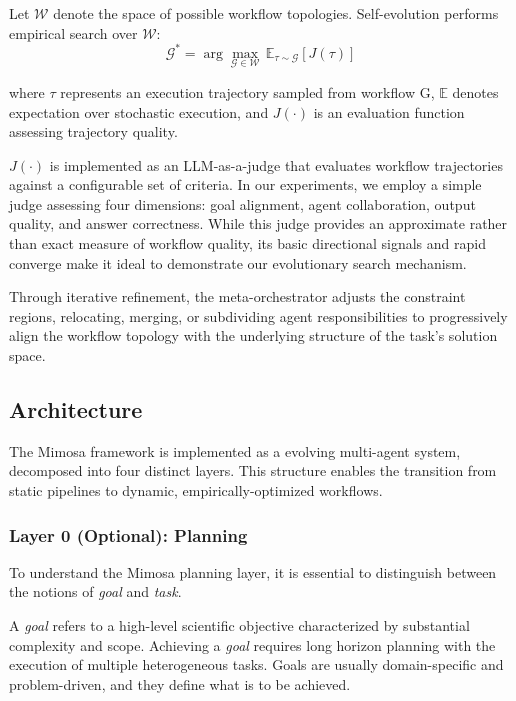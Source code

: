 \documentclass{article}
\begin{document}
Let $\mathcal{W}$ denote the space of possible workflow topologies. Self-evolution performs empirical search over $\mathcal{W}$:
\begin{equation}
    \mathcal{G}^* = \arg\max_{\mathcal{G} \in \mathcal{W}} \, \mathbb{E}_{\tau \sim \mathcal{G}}[J(\tau)]
\end{equation}

where $\tau$ represents an execution trajectory sampled from workflow G, $\mathbb{E}$ denotes expectation over stochastic execution, and $J(\cdot)$ is an evaluation function assessing trajectory quality.

$J(\cdot)$ is implemented as an LLM-as-a-judge that evaluates workflow trajectories against a configurable set of criteria. In our experiments, we employ a simple judge assessing four dimensions: goal alignment, agent collaboration, output quality, and answer correctness. While this judge provides an approximate rather than exact measure of workflow quality, its basic directional signals and rapid converge make it ideal to demonstrate our evolutionary search mechanism.

Through iterative refinement, the meta-orchestrator adjusts the constraint regions, relocating, merging, or subdividing agent responsibilities to progressively align the workflow topology with the underlying structure of the task's solution space.

\vspace{8em}

\subsection{Architecture}

The Mimosa framework is implemented as a evolving multi-agent system, decomposed into four distinct layers. This structure enables the transition from static pipelines to dynamic, empirically-optimized workflows.

\subsubsection{\textbf{Layer 0 (Optional): Planning}}

To understand the Mimosa planning layer, it is essential to distinguish between the notions of \textit{goal} and \textit{task}.

A \textit{goal} refers to a high-level scientific objective characterized by substantial complexity and scope. Achieving a \textit{goal} requires long horizon planning with the execution of multiple heterogeneous tasks. Goals are usually domain-specific and problem-driven, and they define what is to be achieved.
\end{document}
